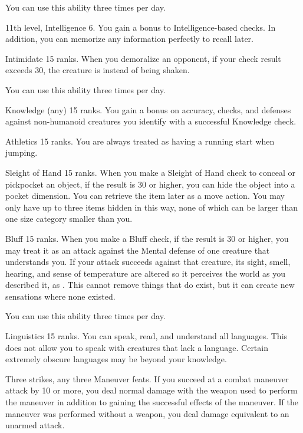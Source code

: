 You can use this ability three times per day.

\featpres 11th level, Intelligence 6.
\featben You gain a  bonus to Intelligence-based checks.
In addition, you can memorize any information perfectly to recall later.

\featpre Intimidate 15 ranks.
\featben When you demoralize an opponent, if your check result exceeds 30, the creature is \panicked instead of being shaken.

You can use this ability three times per day.

\featpre Knowledge (any) 15 ranks.
\featben You gain a  bonus on accuracy, checks, and defenses against non-humanoid creatures you identify with a successful Knowledge check.

\featpre Athletics 15 ranks.
\featben You are always treated as having a running start when jumping.

\featpre Sleight of Hand 15 ranks.
\featben When you make a Sleight of Hand check to conceal or pickpocket an object, if the result is 30 or higher, you can hide the object into a pocket dimension.
You can retrieve the item later as a move action.
You may only have up to three items hidden in this way, none of which can be larger than one size category smaller than you.

\featpre Bluff 15 ranks.
\featben When you make a Bluff check, if the result is 30 or higher, you may treat it as an attack against the Mental defense of one creature that understands you.
If your attack succeeds against that creature, its sight, smell, hearing, and sense of temperature are altered so it perceives the world as you described it, as .
This cannot remove things that do exist, but it can create new sensations where none existed.

You can use this ability three times per day.

\featpre Linguistics 15 ranks.
\featben You can speak, read, and understand all languages.
This does not allow you to speak with creatures that lack a language.
Certain extremely obscure languages may be beyond your knowledge.

\featpres Three strikes, any three Maneuver feats.
\featben If you succeed at a combat maneuver attack by 10 or more, you deal normal damage with the weapon used to perform the maneuver in addition to gaining the successful effects of the maneuver.
If the maneuver was performed without a weapon, you deal damage equivalent to an unarmed attack.

